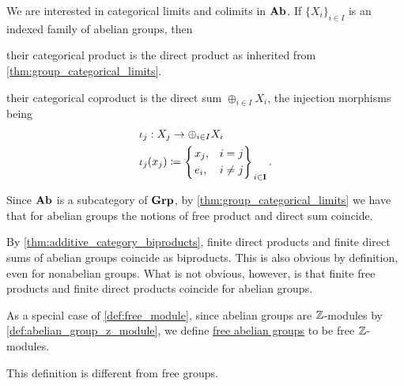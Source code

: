 \begin{proposition}\label{thm:abelian_group_categorical_limits}
  We are interested in categorical limits and colimits in $\operatorname{\mathbf{Ab}}$. If $\{ X_i \}_{i \in I}$ is an indexed family of abelian groups, then
  \begin{defenum}
    \item\label{thm:abelian_group_categorical_limits/product} their categorical product is the direct product as inherited from \cref{thm:group_categorical_limits}.

    \item\label{thm:abelian_group_categorical_limits/coproduct} their categorical coproduct is the direct sum $\oplus_{i \in I} X_i$, the injection morphisms being
    \begin{align*}
      &\iota_j: X_j \to \oplus_{i \in I} X_i \\
      &\iota_j(x_j) \coloneqq \begin{dcases}
        \begin{drcases}
          x_j, &i = j \\
          e_i, &i \neq j
        \end{drcases}
      \end{dcases}_{i \in \Bold I}.
    \end{align*}

    Since $\operatorname{\mathbf{Ab}}$ is a subcategory of $\operatorname{\mathbf{Grp}}$, by \cref{thm:group_categorical_limits} we have that for abelian groups the notions of free product and direct sum coincide.
  \end{defenum}
\end{proposition}

\begin{note}\label{note:abelian_group_biproducts}
  By \cref{thm:additive_category_biproducts}, finite direct products and finite direct sums of abelian groups coincide as biproducts. This is also obvious by definition, even for nonabelian groups. What is not obvious, however, is that finite free products and finite direct products coincide for abelian groups.
\end{note}

\begin{definition}\label{def:free_abelian_group}
  As a special case of \cref{def:free_module}, since abelian groups are $\mathbb Z$-modules by \cref{def:abelian_group_z_module}, we define \uline{free abelian groups} to be free $\mathbb Z$-modules.

  This definition is different from free groups.
\end{definition}
